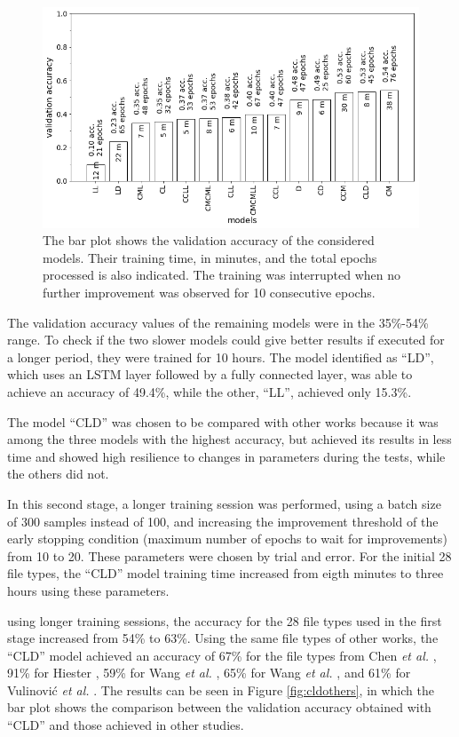 \noindent
\begin{figure}[htb!]
\centering\includegraphics[width=1.0\textwidth]{content/models.png}
\caption[Validation accuracy of models]{\label{fig:models}The bar plot shows the validation accuracy of the considered models. Their training time, in minutes, and the total epochs processed is also indicated. The training was interrupted when no further improvement was observed for 10 consecutive epochs.}%
\end{figure}

The validation accuracy values of the remaining models were in the 35\%-54\% range.
To check if the two slower models could give better results if executed for a longer period, they were trained for 10 hours. The model identified as ``LD'', which uses an LSTM layer followed by a fully connected layer, was able to achieve an accuracy of 49.4\%, while the other, ``LL'', achieved only 15.3\%.

The model ``CLD'' was chosen to be compared with other works because it was among the three models with the highest accuracy, but achieved its results in less time and showed high resilience to changes in parameters during the tests, while the others did not.

In this second stage, a longer training session was performed, using a batch size of 300 samples instead of 100, and increasing the improvement threshold of the early stopping condition (maximum number of epochs to wait for improvements) from 10 to 20. These parameters were chosen by trial and error. For the initial 28 file types, the ``CLD'' model training time increased from eigth minutes to three hours using these parameters.
 
using longer training sessions, the accuracy for the 28 file types used in the first stage increased from 54\% to 63\%. Using the same file types of other works, the ``CLD'' model achieved an accuracy of 
67\% for the file types from Chen \textit{et al.} \cite{chen_file_2018},
91\% for Hiester \cite{hiester_file_2018}, 
59\% for Wang \textit{et al.} \cite{wang_sparse_2018},
65\% for Wang \textit{et al.} \cite{wang_file_2018},
and
61\% for Vulinović \textit{et al.} \cite{vulinovic_neural_2019}.
The results can be seen in Figure \ref{fig:cldothers}, in which the bar plot shows the comparison between the validation accuracy obtained with ``CLD'' and those achieved in other studies.

